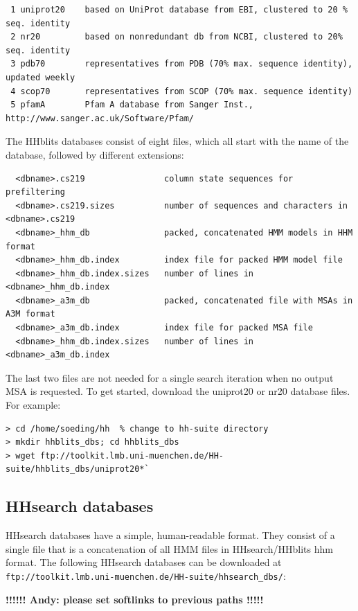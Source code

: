 \documentclass[11pt,a4paper]{article}
\begin{document}
\small 
\begin{verbatim}
 1 uniprot20    based on UniProt database from EBI, clustered to 20 % seq. identity
 2 nr20         based on nonredundant db from NCBI, clustered to 20% seq. identity
 3 pdb70        representatives from PDB (70% max. sequence identity), updated weekly
 4 scop70       representatives from SCOP (70% max. sequence identity)
 5 pfamA        Pfam A database from Sanger Inst., http://www.sanger.ac.uk/Software/Pfam/
\end{verbatim} 
\normalsize

The HHblits databases consist of eight files, which all start with the name of the database, followed by different extensions:
\begin{verbatim}
  <dbname>.cs219                column state sequences for prefiltering
  <dbname>.cs219.sizes          number of sequences and characters in <dbname>.cs219  
  <dbname>_hhm_db               packed, concatenated HMM models in HHM format
  <dbname>_hhm_db.index         index file for packed HMM model file
  <dbname>_hhm_db.index.sizes   number of lines in <dbname>_hhm_db.index
  <dbname>_a3m_db               packed, concatenated file with MSAs in A3M format
  <dbname>_a3m_db.index         index file for packed MSA file
  <dbname>_hhm_db.index.sizes   number of lines in <dbname>_a3m_db.index
\end{verbatim}

The last two files are not needed for a single search iteration when no output MSA is requested. To get started, download the uniprot20 or nr20 database files. For example:

\begin{verbatim}
> cd /home/soeding/hh  % change to hh-suite directory
> mkdir hhblits_dbs; cd hhblits_dbs
> wget ftp://toolkit.lmb.uni-muenchen.de/HH-suite/hhblits_dbs/uniprot20*`
\end{verbatim}

\subsection{HHsearch databases}
HHsearch databases have a simple, human-readable format. They consist of a single file that is a concatenation of all HMM files in HHsearch/HHblits hhm format. The following HHsearch databases can be downloaded at
\verb`ftp://toolkit.lmb.uni-muenchen.de/HH-suite/hhsearch_dbs/`: 

{\bf !!!!!! Andy: please set softlinks to previous paths !!!!!}
\end{document}
